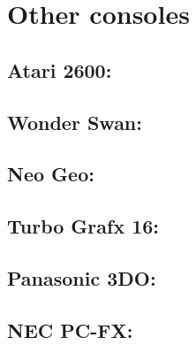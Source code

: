 \section {Other consoles}

\subsection{Atari 2600:}
\subsection{Wonder Swan:}
\subsection{Neo Geo:}
\subsection{Turbo Grafx 16:}
\subsection{Panasonic 3DO:}
\subsection{NEC PC-FX:}

